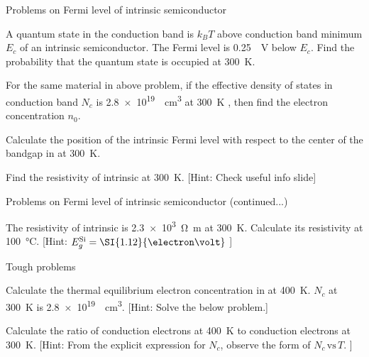 \begin{frame}[label=pre-M2T1-slot1]{Problems on Fermi level of intrinsic semiconductor}
	\begin{problem}
		A quantum state in the conduction band is \(k_BT\) above conduction band minimum \(E_c\) of an intrinsic semiconductor. The Fermi level is \SI{0.25}{\electron\volt} below \(E_c\). Find the probability that the quantum state is occupied at \SI{300}{\kelvin}.
	\end{problem}
	\begin{problem}
		For the same material in above problem, if the effective density of states in conduction band \(N_c\) is \SI{2.8e19}{\per\centi\metre\cubed} at \SI{300}{\kelvin} , then find the electron concentration \(n_0\).
	\end{problem}
	\begin{problem}
		Calculate the position of the intrinsic Fermi level with respect to the center of the bandgap in  at \SI{300}{\kelvin}.
	\end{problem}
	\begin{problem}
		Find the resistivity of intrinsic  at \SI{300}{\kelvin}. \hfill [Hint: Check useful info slide]
	\end{problem}
\end{frame}
%
\begin{frame}[label=pre-M2T1-slot1]{Problems on Fermi level of intrinsic semiconductor (continued...)}
	\begin{problem}
		The resistivity of intrinsic  is \SI{2.3e3}{\ohm\metre} at \SI{300}{\kelvin}. Calculate its resistivity at \SI{100}{\celsius}. \hfill [Hint: \(E_g^\text{Si} = \SI{1.12}{\electron\volt}\) ]
	\end{problem}
	\begin{center}
		{\huge Tough problems}
	\end{center}
	\begin{problem}
		Calculate the thermal equilibrium electron concentration in  at \SI{400}{\kelvin}. \(N_c\) at \SI{300}{\kelvin} is \SI{2.8e19}{\per\centi\metre\cubed}. \hfill [Hint: Solve the below problem.]
	\end{problem}
	\begin{problem}
		Calculate the ratio of conduction electrons at \SI{400}{\kelvin} to conduction electrons at \SI{300}{\kelvin}. \hfill [Hint: From the explicit expression for \(N_c\), observe the form of \(N_c \, \text{vs}\, T\). ]
	\end{problem}
\end{frame}

